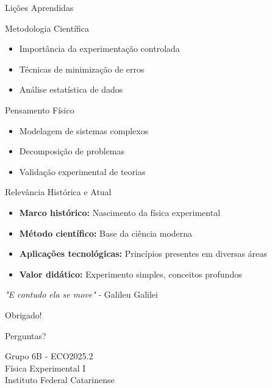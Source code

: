 \documentclass[12pt]{beamer}
\begin{document}
\begin{frame}{Lições Aprendidas}
    \begin{block}{Metodologia Científica}
        \begin{itemize}
            \item Importância da experimentação controlada
            \item Técnicas de minimização de erros
            \item Análise estatística de dados
        \end{itemize}
    \end{block}

    \begin{block}{Pensamento Físico}
        \begin{itemize}
            \item Modelagem de sistemas complexos
            \item Decomposição de problemas
            \item Validação experimental de teorias
        \end{itemize}
    \end{block}
\end{frame}

\begin{frame}{Relevância Histórica e Atual}
    \begin{itemize}
        \item \textbf{Marco histórico:} Nascimento da física experimental
        \item \textbf{Método científico:} Base da ciência moderna
        \item \textbf{Aplicações tecnológicas:} Princípios presentes em diversas áreas
        \item \textbf{Valor didático:} Experimento simples, conceitos profundos
    \end{itemize}

    \begin{center}
        \textit{"E contudo ela se move"} - Galileu Galilei
    \end{center}
\end{frame}

\begin{frame}
    \begin{center}
        \Huge Obrigado!

        \vspace{1cm}

        \Large Perguntas?

        \vspace{1cm}

        \normalsize
        Grupo 6B - ECO2025.2 \\
        Física Experimental I \\
        Instituto Federal Catarinense
    \end{center}
\end{frame}
\end{document}
